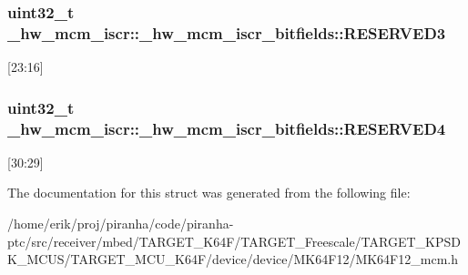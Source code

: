 \subsubsection[{\texorpdfstring{R\+E\+S\+E\+R\+V\+E\+D3}{RESERVED3}}]{\setlength{\rightskip}{0pt plus 5cm}uint32\+\_\+t \+\_\+hw\+\_\+mcm\+\_\+iscr\+::\+\_\+hw\+\_\+mcm\+\_\+iscr\+\_\+bitfields\+::\+R\+E\+S\+E\+R\+V\+E\+D3}\hypertarget{struct__hw__mcm__iscr_1_1__hw__mcm__iscr__bitfields_aab4b4bf6dca1b0182e6863f99b8b3874}{}\label{struct__hw__mcm__iscr_1_1__hw__mcm__iscr__bitfields_aab4b4bf6dca1b0182e6863f99b8b3874}
\mbox{[}23\+:16\mbox{]} 
\subsubsection[{\texorpdfstring{R\+E\+S\+E\+R\+V\+E\+D4}{RESERVED4}}]{\setlength{\rightskip}{0pt plus 5cm}uint32\+\_\+t \+\_\+hw\+\_\+mcm\+\_\+iscr\+::\+\_\+hw\+\_\+mcm\+\_\+iscr\+\_\+bitfields\+::\+R\+E\+S\+E\+R\+V\+E\+D4}\hypertarget{struct__hw__mcm__iscr_1_1__hw__mcm__iscr__bitfields_abd4eccc45cf6ce6e1513bb974bb5497f}{}\label{struct__hw__mcm__iscr_1_1__hw__mcm__iscr__bitfields_abd4eccc45cf6ce6e1513bb974bb5497f}
\mbox{[}30\+:29\mbox{]} 

The documentation for this struct was generated from the following file\+:\begin{DoxyCompactItemize}
\item 
/home/erik/proj/piranha/code/piranha-\/ptc/src/receiver/mbed/\+T\+A\+R\+G\+E\+T\+\_\+\+K64\+F/\+T\+A\+R\+G\+E\+T\+\_\+\+Freescale/\+T\+A\+R\+G\+E\+T\+\_\+\+K\+P\+S\+D\+K\+\_\+\+M\+C\+U\+S/\+T\+A\+R\+G\+E\+T\+\_\+\+M\+C\+U\+\_\+\+K64\+F/device/device/\+M\+K64\+F12/M\+K64\+F12\+\_\+mcm.\+h\end{DoxyCompactItemize}
